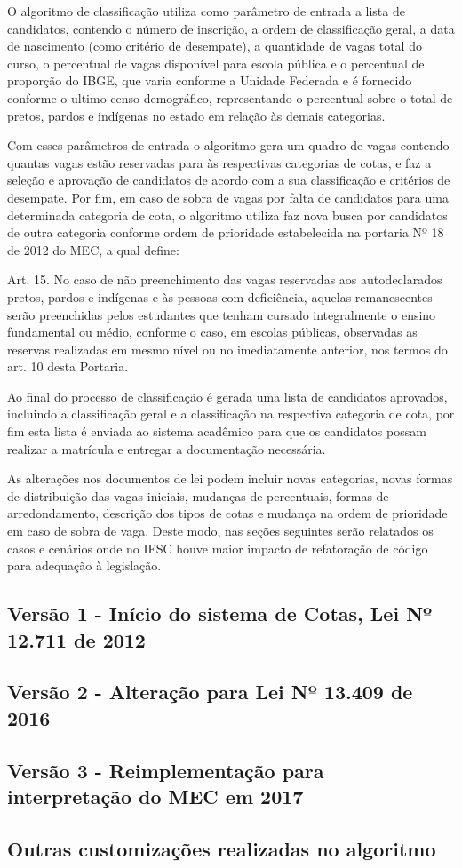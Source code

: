 O algoritmo de classificação utiliza como parâmetro de entrada a lista de candidatos, contendo o número de inscrição, a ordem de classificação geral, a data de nascimento (como critério de desempate), a quantidade de vagas total do curso, o percentual de vagas disponível para escola pública e o percentual de proporção do \gls{IBGE}, que varia conforme a Unidade Federada e é fornecido conforme o ultimo censo demográfico, representando o percentual sobre o total de pretos, pardos e indígenas no estado em relação às demais categorias.

Com esses parâmetros de entrada o algoritmo gera um quadro de vagas contendo quantas vagas estão reservadas para às respectivas categorias de cotas, e faz a seleção e aprovação de candidatos de acordo com a sua classificação e critérios de desempate. Por fim, em caso de sobra de vagas por falta de candidatos para uma determinada categoria de cota, o algoritmo utiliza faz nova busca por candidatos de outra categoria conforme ordem de prioridade estabelecida na portaria Nº 18 de 2012 do \gls{MEC}, a qual define:

\begin{citacao}
Art. 15. No caso de não preenchimento das vagas reservadas aos autodeclarados pretos, pardos
e indígenas e às pessoas com deficiência, aquelas remanescentes serão preenchidas pelos
estudantes que tenham cursado integralmente o ensino fundamental ou médio, conforme o caso,
em escolas públicas, observadas as reservas realizadas em mesmo nível ou no imediatamente
anterior, nos termos do art. 10 desta Portaria. \cite{portarianr9}
\end{citacao}

Ao final do processo de classificação é gerada uma lista de candidatos aprovados, incluindo a classificação geral e a classificação na respectiva categoria de cota, por fim esta lista é enviada ao sistema acadêmico para que os candidatos possam realizar a matrícula e entregar a documentação necessária. 

As alterações nos documentos de lei podem incluir novas categorias, novas formas de distribuição das vagas iniciais, mudanças de percentuais, formas de arredondamento, descrição dos tipos de cotas e mudança na ordem de prioridade em caso de sobra de vaga. Deste modo, nas seções seguintes serão relatados os casos e cenários onde no \gls{IFSC} houve maior impacto de refatoração de código para adequação à legislação.


\subsection{Versão 1 - Início do sistema de Cotas, Lei Nº 12.711 de 2012}
\label{versao1}

\subsection{Versão 2 - Alteração para Lei Nº 13.409 de 2016 }
\label{versao1}

\subsection{Versão 3 - Reimplementação para interpretação do MEC em 2017 }
\label{versao1}

\subsection{Outras customizações realizadas no algoritmo}
\label{versao1}